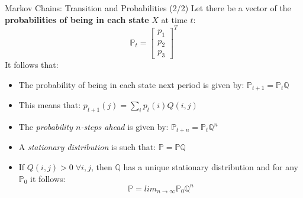 \documentclass[10pt,c,aspectratio=1610,handout]{beamer}
\begin{document}
\begin{frame}{Markov Chains: Transition and Probabilities (2/2)}%
  Let there be a vector of the \textbf{probabilities of being in each state} $X$ at time $t$:\\%
  \[ \mathbb{P}_t = \left [ \begin{array}{c} p_1 \\ p_2 \\ p_3 \end{array} \right ]^T \]%
  \pause%
  It follows that:%
  \begin{itemize}%
    \item[$\blacktriangleright$] The probability of being in each state next period is given by: $\mathbb{P}_{t+1} =  \mathbb{P}_t \mathbb{Q}$%
    \vspace*{0.05in}%
    \item[$\blacktriangleright$] This means that: $p_{t+1}(j) = \sum_i p_{t}(i) Q(i,j)$%
    \vspace*{0.05in}%
    \pause%
    \item[$\blacktriangleright$] The \emph{probability $n$-steps ahead} is given by: $\mathbb{P}_{t+n} =  \mathbb{P}_t \mathbb{Q}^n$%
    \vspace*{0.05in}%
    \pause%
    \item[$\blacktriangleright$] A \emph{stationary distribution} is such that: $\mathbb{P} =  \mathbb{P} \mathbb{Q}$%
    \vspace*{0.05in}%
    \pause%
    \item[$\blacktriangleright$] If $Q(i,j)>0 \; \forall i,j$, then $\mathbb{Q}$ has a unique stationary distribution and for any $\mathbb{P}_0$ it follows: $$\mathbb{P} = lim_{n \rightarrow \infty} \mathbb{P}_0 \mathbb{Q}^n$$%
  \end{itemize}%
\end{frame}%
\end{document}
